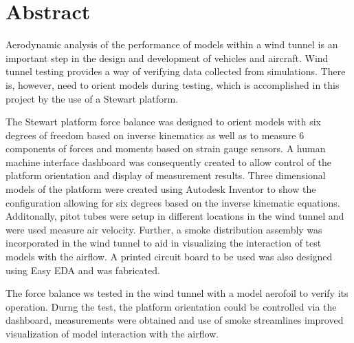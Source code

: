 
\section*{Abstract}
\label{sec:Abstract}
Aerodynamic analysis of the performance of models within a wind tunnel is an important step in the design and development of vehicles and aircraft. Wind tunnel testing provides a way of verifying data collected from simulations.
There is, however, need to orient models during testing, which is accomplished in this project by the use of a Stewart platform.

The Stewart platform force balance was designed to orient models with six degrees of freedom based on inverse kinematics
as well as to measure 6 components of forces and moments based on strain gauge sensors. 
A human machine interface dashboard was consequently created to allow control of the platform orientation and display of measurement results. Three dimensional models of the platform were created using Autodesk Inventor to show the configuration allowing for six degrees based on the inverse kinematic equations. 
Additonally, pitot tubes were setup in different locations in the wind tunnel and were used measure air velocity. Further,
a smoke distribution assembly was incorporated in the wind tunnel to aid in visualizing the interaction
of test models with the airflow. A printed circuit board to be used was also designed using Easy EDA and was fabricated. 


The force balance ws tested in the wind tunnel with a model aerofoil to verify its operation. Durng the test,
the platform orientation could be controlled via the dashboard, measurements were obtained and use of smoke 
streamlines improved visualization of model interaction with the airflow.


